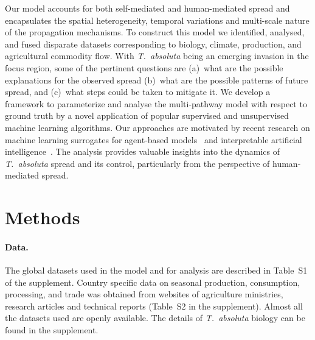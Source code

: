 \documentclass[11pt]{article}
\newcommand{\tuta}{\emph{T.~absoluta}}
\theoremstyle{definition}
\begin{document}
Our model accounts for both self-mediated and human-mediated spread and
encapsulates the spatial heterogeneity, temporal variations and
multi-scale nature of the propagation mechanisms. To construct this model we
identified, analysed, and fused disparate datasets corresponding to
biology, climate, production, and agricultural commodity flow. With \tuta{}
being an emerging invasion in the focus region, some of the pertinent
questions are (a)~what are the possible explanations for the observed
spread (b)~what are the possible patterns of future spread, and (c)~what
steps could be taken to mitigate it. We develop a framework to parameterize
and analyse the multi-pathway model with respect to ground truth by a novel
application of popular supervised and unsupervised machine learning
algorithms. Our approaches are motivated by recent research on machine
learning surrogates for agent-based models~\cite{lamperti2018agent} and
interpretable artificial intelligence~\cite{guidotti2019survey}. The
analysis provides valuable insights into the dynamics of \tuta{} spread and
its control, particularly from the perspective of human-mediated spread.


\section{Methods}
\paragraph{Data.} The global datasets used in the model and for analysis
are described in Table~S1 of the supplement. Country specific
data on seasonal production, consumption, processing, and trade was obtained
from websites of agriculture ministries, research articles and technical
reports (Table~S2 in the supplement). Almost all the
datasets used are openly available. The details of \tuta{} biology can be
found in the supplement. 
\end{document}

